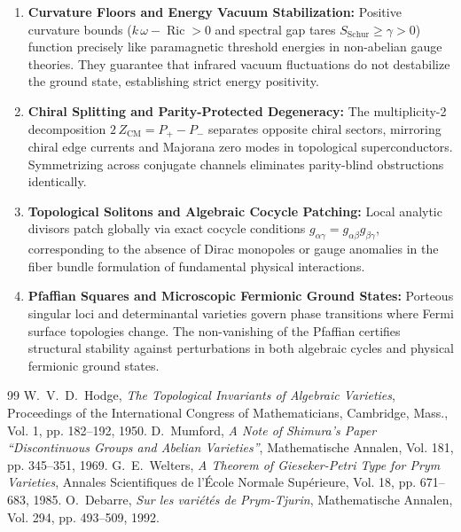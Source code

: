 \documentclass[11pt,a4paper]{article}
\theoremstyle{definition}
\begin{document}
\begin{enumerate}
  \item \textbf{Curvature Floors and Energy Vacuum Stabilization:} 
  Positive curvature bounds ($k\,\omega - \operatorname{Ric} > 0$ and spectral gap tares $S_{\mathrm{Schur}} \ge \gamma > 0$) function precisely like paramagnetic threshold energies in non-abelian gauge theories. They guarantee that infrared vacuum fluctuations do not destabilize the ground state, establishing strict energy positivity.
  
  \item \textbf{Chiral Splitting and Parity-Protected Degeneracy:} 
  The multiplicity-2 decomposition $2\,Z_{\mathrm{CM}} = P_+ - P_-$ separates opposite chiral sectors, mirroring chiral edge currents and Majorana zero modes in topological superconductors. Symmetrizing across conjugate channels eliminates parity-blind obstructions identically.
  
  \item \textbf{Topological Solitons and Algebraic Cocycle Patching:} 
  Local analytic divisors patch globally via exact cocycle conditions $g_{\alpha\gamma} = g_{\alpha\beta} g_{\beta\gamma}$, corresponding to the absence of Dirac monopoles or gauge anomalies in the fiber bundle formulation of fundamental physical interactions.
  
  \item \textbf{Pfaffian Squares and Microscopic Fermionic Ground States:} 
  Porteous singular loci and determinantal varieties govern phase transitions where Fermi surface topologies change. The non-vanishing of the Pfaffian certifies structural stability against perturbations in both algebraic cycles and physical fermionic ground states.
\end{enumerate}

\begin{thebibliography}{99}
 W.~V.~D.~Hodge, \emph{The Topological Invariants of Algebraic Varieties}, Proceedings of the International Congress of Mathematicians, Cambridge, Mass., Vol. 1, pp. 182--192, 1950.
 D.~Mumford, \emph{A Note of Shimura's Paper ``Discontinuous Groups and Abelian Varieties''}, Mathematische Annalen, Vol. 181, pp. 345--351, 1969.
 G.~E.~Welters, \emph{A Theorem of Gieseker-Petri Type for Prym Varieties}, Annales Scientifiques de l'\'Ecole Normale Sup\'erieure, Vol. 18, pp. 671--683, 1985.
 O.~Debarre, \emph{Sur les vari\'et\'es de Prym-Tjurin}, Mathematische Annalen, Vol. 294, pp. 493--509, 1992.
\end{thebibliography}
\end{document}
